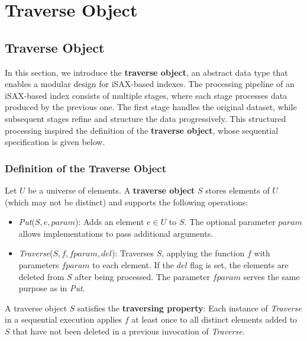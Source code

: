 \chapter{Traverse Object}
\label{chapter:traverse-object}

\section{Traverse Object}

In this section, we introduce the \textbf{traverse object}, an abstract data type
that enables a modular design for iSAX-based indexes. The processing pipeline of
an iSAX-based index consists of multiple stages, where each stage processes data
produced by the previous one. The first stage handles the original dataset, while
subsequent stages refine and structure the data progressively. This structured
processing inspired the definition of the \textbf{traverse object}, whose
sequential specification is given below.

\subsection{Definition of the Traverse Object}

\begin{definition}
\label{def:traverse}
Let $U$ be a universe of elements. A \textbf{traverse object} $S$ stores elements
of $U$ (which may not be distinct) and supports the following operations:

\begin{itemize}
    \item \textit{Put}($S,e,\mathit{param}$): Adds an element $e \in U$ to $S$.
    The optional parameter $\mathit{param}$ allows implementations to pass
    additional arguments.
    
    \item \textit{Traverse}($S,f,\mathit{fparam},del$): Traverses $S$, applying
    the function $f$ with parameters $\mathit{fparam}$ to each element. If the
    $del$ flag is set, the elements are deleted from $S$ after being processed.
    The parameter $\mathit{fparam}$ serves the same purpose as in \textit{Put}.
\end{itemize}

A traverse object $S$ satisfies the \textbf{traversing property}:  
Each instance of \textit{Traverse} in a sequential execution applies $f$ at
least once to all distinct elements added to $S$ that have not been deleted
in a previous invocation of \textit{Traverse}.
\end{definition}

